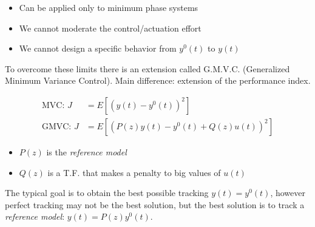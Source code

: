 \begin{itemize}
    \item Can be applied only to minimum phase systems
    \item We cannot moderate the control/actuation effort
    \item We cannot design a specific behavior from $y^0(t)$ to $y(t)$
\end{itemize}

To overcome these limits there is an extension called G.M.V.C. (Generalized Minimum Variance Control).
Main difference: extension of the performance index.

\begin{align*}
    \text{MVC: } J &= E\left[ \left(y(t) - y^0(t)\right)^2 \right] \\
    \text{GMVC: } J &= E\left[ \left(P(z)y(t) - y^0(t) + Q(z)u(t)\right)^2 \right]
\end{align*}
\begin{itemize}
    \item $P(z)$ is the \emph{reference model}
    \item $Q(z)$ is a T.F. that makes a penalty to big values of $u(t)$
\end{itemize}

\begin{rem}
    \begin{figure}[H]
        \centering
    \end{figure}

    The typical goal is to obtain the best possible tracking $y(t) = y^0(t)$, however perfect tracking may not be the best solution, but the best solution is to track a \emph{reference model}: $y(t) = P(z)y^0(t)$.
\end{rem}

